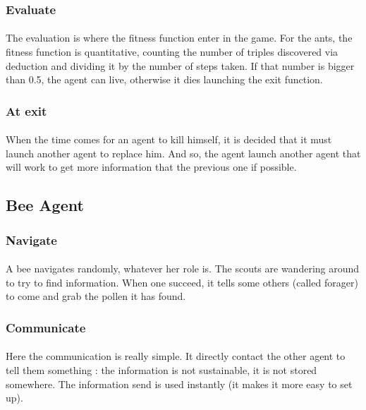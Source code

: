 \documentclass{article}
\begin{document}
		\subsubsection{Evaluate}
			\paragraph{}
			The evaluation is where the fitness function enter in the game.
			For the ants, the fitness function is quantitative,
			counting the number of triples discovered via deduction and dividing it by the number of steps taken.
			If that number is bigger than 0.5, the agent can live, otherwise it dies launching the exit function.
		\subsubsection{At exit}
			\paragraph{}
			When the time comes for an agent to kill himself, it is decided that it must launch another agent to replace him.
			And so, the agent launch another agent that will work to get more information that the previous one if possible.
	\subsection{Bee Agent}
		\subsubsection{Navigate}
			\paragraph{}
			A bee navigates randomly, whatever her role is.
			The scouts are wandering around to try to find information.
			When one succeed, it tells some others (called forager) to come and grab the pollen it has found.
		\subsubsection{Communicate}
			\paragraph{}
			Here the communication is really simple.
			It directly contact the other agent to tell them something : the information is not sustainable, it is not stored somewhere.
			The information send is used instantly (it makes it more easy to set up).
\end{document}
